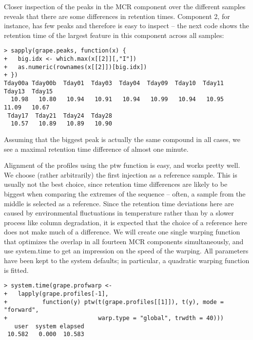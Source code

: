 \documentclass[a4paper,11pt]{article}\usepackage[]{graphicx}\usepackage[]{color}
\makeatletter
\newenvironment{kframe}{%
 \def\at@end@of@kframe{}%
 \ifinner\ifhmode%
  \def\at@end@of@kframe{\end{minipage}}%
  \begin{minipage}{\columnwidth}%
 \fi\fi%
 \def\FrameCommand##1{\hskip\@totalleftmargin \hskip-\fboxsep
 \colorbox{shadecolor}{##1}\hskip-\fboxsep
     \hskip-\linewidth \hskip-\@totalleftmargin \hskip\columnwidth}%
 \MakeFramed {\advance\hsize-\width
   \@totalleftmargin\z@ \linewidth\hsize
   \@setminipage}}%
 {\par\unskip\endMakeFramed%
 \at@end@of@kframe}
\newenvironment{knitrout}{}{} %
\newcommand{\code}[1]{{\ttfamily #1}}
\makeatother
\begin{document}
Closer inspection of the peaks in the MCR component over
the different samples reveals that there are some differences in
retention times. Component 2, for instance, has few peaks and
therefore is easy to inspect -- the next code shows the retention time
of the largest feature in this component across all samples:

\begin{knitrout}\small
{}\color{fgcolor}\begin{kframe}
\begin{verbatim}
> sapply(grape.peaks, function(x) {
+   big.idx <- which.max(x[[2]][,"I"])
+   as.numeric(rownames(x[[2]])[big.idx])
+ })
Tday00a Tday00b  Tday01  Tday03  Tday04  Tday09  Tday10  Tday11  Tday13  Tday15 
  10.98   10.80   10.94   10.91   10.94   10.99   10.94   10.95   11.09   10.67 
 Tday17  Tday21  Tday24  Tday28 
  10.57   10.89   10.89   10.90 
\end{verbatim}
\end{kframe}
\end{knitrout}

\noindent
Assuming that the biggest peak is actually
the same compound in all cases, we see a maximal retention time
difference of almost one minute.

Alignment of the profiles using the ptw function is easy, and works
pretty well. We choose (rather arbitrarily) the first injection as a
reference sample. This is usually not the best choice, since retention
time differences are likely to be biggest when comparing the extremes
of the sequence -- often, a sample from the middle is selected as a
reference. Since the retention time deviations here are caused by
environmental fluctuations in temperature rather than by a slower
process like column degradation, it is expected that the choice of a
reference here does not make much of a difference. We will create one
single warping function that optimizes the overlap in all fourteen MCR
components simultaneously, and use \code{system.time} to get an
impression on the speed of the warping. All parameters have been kept
to the system defaults; in particular, a quadratic warping function is
fitted.

\begin{knitrout}\small
{}\color{fgcolor}\begin{kframe}
\begin{verbatim}
> system.time(grape.profwarp <- 
+   lapply(grape.profiles[-1],
+          function(y) ptw(t(grape.profiles[[1]]), t(y), mode = "forward",
+                          warp.type = "global", trwdth = 40)))
   user  system elapsed 
 10.582   0.000  10.583 
\end{verbatim}
\end{kframe}
\end{knitrout}
\end{document}
